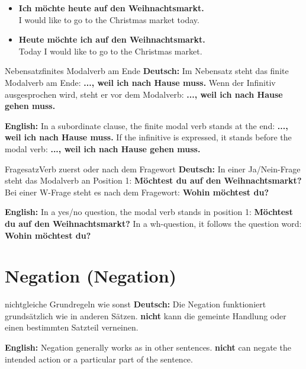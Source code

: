 \documentclass[a4paper,11pt]{article}
\newcommand{\GermanText}[1]{\textbf{Deutsch: }#1\par}
\newcommand{\EnglishText}[1]{{\small\color{SoftGray}\textbf{English: }#1\par}}
\newcommand{\ExampleItem}[2]{\item \textbf{#1}\\{\small\color{SoftGray}#2}}
\begin{document}
        \begin{exbox}
            \begin{itemize}
                \ExampleItem{Ich möchte heute auf den Weihnachtsmarkt.}{I would like to go to the Christmas market today.}
                \ExampleItem{Heute möchte ich auf den Weihnachtsmarkt.}{Today I would like to go to the Christmas market.}
            \end{itemize}
        \end{exbox}

        \begin{grammarentry}{Nebensatz}{finites Modalverb am Ende}
            \GermanText{Im Nebensatz steht das finite Modalverb am Ende: \textbf{..., weil ich nach Hause muss.} Wenn der Infinitiv ausgesprochen wird, steht er vor dem Modalverb: \textbf{..., weil ich nach Hause gehen muss.}}
            \EnglishText{In a subordinate clause, the finite modal verb stands at the end: \textbf{..., weil ich nach Hause muss.} If the infinitive is expressed, it stands before the modal verb: \textbf{..., weil ich nach Hause gehen muss.}}
        \end{grammarentry}

        \begin{grammarentry}{Fragesatz}{Verb zuerst oder nach dem Fragewort}
            \GermanText{In einer Ja/Nein-Frage steht das Modalverb an Position 1: \textbf{Möchtest du auf den Weihnachtsmarkt?} Bei einer W-Frage steht es nach dem Fragewort: \textbf{Wohin möchtest du?}}
            \EnglishText{In a yes/no question, the modal verb stands in position 1: \textbf{Möchtest du auf den Weihnachtsmarkt?} In a wh-question, it follows the question word: \textbf{Wohin möchtest du?}}
        \end{grammarentry}

    \section{Negation \textnormal{(Negation)}}

        \begin{grammarentry}{nicht}{gleiche Grundregeln wie sonst}
            \GermanText{Die Negation funktioniert grundsätzlich wie in anderen Sätzen. \textbf{nicht} kann die gemeinte Handlung oder einen bestimmten Satzteil verneinen.}
            \EnglishText{Negation generally works as in other sentences. \textbf{nicht} can negate the intended action or a particular part of the sentence.}
        \end{grammarentry}
\end{document}
